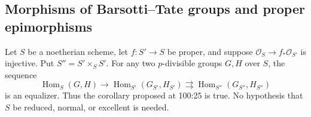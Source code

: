 \subsection{Morphisms of Barsotti--Tate groups and proper epimorphisms}

\begin{proposition}\label{prop:C-RD1}
Let $S$ be a noetherian scheme, let $f:S'\to S$ be proper, and suppose
$\mathcal O_S\to f_*\mathcal O_{S'}$ is injective. Put $S''=S'\times_S S'$.
For any two $p$-divisible groups $G,H$ over $S$, the sequence
\[
 \operatorname{Hom}_S(G,H)\longrightarrow
 \operatorname{Hom}_{S'}(G_{S'},H_{S'})
 \rightrightarrows
 \operatorname{Hom}_{S''}(G_{S''},H_{S''})
\]
is an equalizer. Thus the corollary proposed at 100:25 is true. No hypothesis
that $S$ be reduced, normal, or excellent is needed.
\end{proposition}

